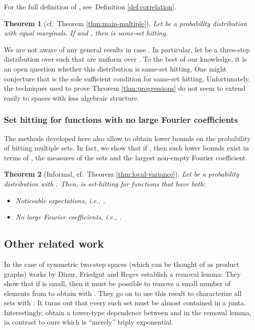 \documentclass{daj}
\newcommand{\1}{\mathbbm{1}}
\theoremstyle{plain}
\newtheorem{theorem}{Theorem}[section]
\theoremstyle{definition}
\begin{document}
For the full definition of , see~Definition \ref{def:correlation}.

\begin{theorem}[cf.~Theorem \ref{thm:main-multiple}]
\label{thm:rho-hitting}
Let  be a probability distribution with equal marginals.
If  and , then 
is same-set hitting.
\end{theorem}

We are not aware of any general results in case .
In particular, let  be a three-step distribution over
 such that  are uniform
over . To the best of our knowledge,
it is an open question whether this distribution  is same-set 
hitting.
One might conjecture that  is the sole sufficient
condition for same-set hitting.
Unfortunately, the techniques used to prove Theorem \ref{thm:progressions}
do not seem to extend easily to spaces with less algebraic structure.

\subsubsection{Set hitting for functions  with no large Fourier coefficients}
\label{sec:intro-fourier}

The methods developed here also allow to obtain lower bounds on the 
probability of hitting multiple sets. In fact, we show that if , 
then such lower bounds exist in terms of , 
the measures of the sets and the largest non-empty Fourier coefficient. 

\begin{theorem}[Informal, cf.~Theorem \ref{thm:local-variance}]
\label{thm:local-variance-basic}
Let  be a probability distribution with . Then, 
is set-hitting for functions  that have both:
\begin{itemize}
  \item Noticeable expectations, i.e., 
.
  \item No large Fourier coefficients, i.e.,
.
\end{itemize}
\end{theorem}


\subsection{Other related work}

In the case of symmetric two-step spaces
(which can be thought of as product graphs) 
works by Dinur, Friedgut and Regev \cite{DFR08, FR18}
establish a removal lemma: They show
that if  is small,
then it must be possible to remove a small number of elements from 
to obtain  with .
They go on to use this result to characterize all sets with
: It turns out
that every such set must be almost contained in a junta. 
Interestingly, \cite{FR18} obtain
a tower-type dependence between  and  in the removal lemma,
in contrast to ours which is ``merely'' triply exponential.
\end{document}
